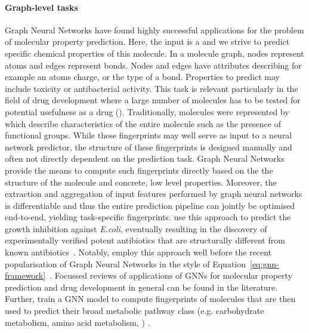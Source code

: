 \documentclass[
	fontsize=10pt, %
	twoside=true, %
	secnumdepth=1, %
  toc=indentunnumbered %
]{kaobook}
\begin{document}
\paragraph{Graph-level tasks} Graph Neural Networks have found highly successful
applications for the problem of molecular property prediction. Here, the input
is a  and we strive to predict specific chemical properties
of this molecule. In a molecule graph, nodes represent atoms and edges represent
bonds. Nodes and edges have attributes describing for example an atoms charge,
or the type of a bond. Properties to predict may include toxicity or
antibacterial activity. This task is relevant particularly in the field of drug
development where a large number of molecules has to be tested for potential
usefulness as a drug ().
%
Traditionally, molecules were represented by  which
describe characteristics of the entire molecule such as the presence of
functional groups. While these fingerprints may well serve as input to a neural
network predictor, the structure of these fingerprints is designed manually and
often not directly dependent on the prediction task.
Graph Neural Networks provide the means to compute such fingerprints directly
based on the the structure of the molecule and concrete, low level properties.
Moreover, the extraction and aggregation of input features performed by graph
neural networks is differentiable and thus the entire prediction pipeline can
jointly be optimised end-to-end, yielding task-specific fingerprints.
\citeauthor{stokes_DeepLearningApproach_2020} use this approach to predict the
growth inhibition against \textit{E.coli}, eventually resulting in the discovery
of experimentally verified potent antibiotics that are structurally different
from known antibiotics~\cite{stokes_DeepLearningApproach_2020}.
%
Notably, \citeauthor{duvenaud_convolutional_2015} employ this approach well
before the recent popularisation of Graph Neural Networks in the style of  
Equation~\ref{eq:gnn-framework}~\cite{duvenaud_convolutional_2015}.
Focussed reviews of applications of GNNs for molecular property prediction
\cite{wieder_CompactReviewMolecular_2020}
and drug development in general
\cite{gaudelet_utilising_2020}
can be found in the literature.
%
Further, \citeauthor{baranwal_deep_2020} train a GNN model to compute
fingerprints of molecules that are then used to predict their broad metabolic
pathway class (e.g. carbohydrate metabolism, amino acid metabolism, \etc)
\cite{baranwal_deep_2020}.
\end{document}
